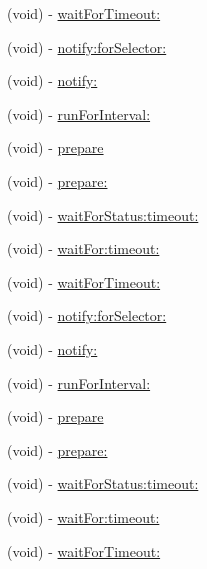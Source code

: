 \begin{DoxyCompactItemize}
\item 
(void) -\/ \hyperlink{interface_g_h_async_test_case_aaf22dd45b3493e110362392cc3dc086b}{wait\-For\-Timeout\-:}
\item 
(void) -\/ \hyperlink{interface_g_h_async_test_case_ab1be43eb4f4909ce5607b51fa0a1f40b}{notify\-:for\-Selector\-:}
\item 
(void) -\/ \hyperlink{interface_g_h_async_test_case_ad21d6cdd1f2a284ee7b5ad5b6d1c82e2}{notify\-:}
\item 
(void) -\/ \hyperlink{interface_g_h_async_test_case_accbc972d3d516d1e53529c84fa2fc510}{run\-For\-Interval\-:}
\item 
(void) -\/ \hyperlink{interface_g_h_async_test_case_a8eda5b64c599e0c48bbd206840bd4cde}{prepare}
\item 
(void) -\/ \hyperlink{interface_g_h_async_test_case_a085b47a16f4a790d77ba78bd2eafb3ff}{prepare\-:}
\item 
(void) -\/ \hyperlink{interface_g_h_async_test_case_ae8781529003ebef3a06569c0157687ae}{wait\-For\-Status\-:timeout\-:}
\item 
(void) -\/ \hyperlink{interface_g_h_async_test_case_a43422127c8303a93f0ae39c883a2da06}{wait\-For\-:timeout\-:}
\item 
(void) -\/ \hyperlink{interface_g_h_async_test_case_aaf22dd45b3493e110362392cc3dc086b}{wait\-For\-Timeout\-:}
\item 
(void) -\/ \hyperlink{interface_g_h_async_test_case_ab1be43eb4f4909ce5607b51fa0a1f40b}{notify\-:for\-Selector\-:}
\item 
(void) -\/ \hyperlink{interface_g_h_async_test_case_ad21d6cdd1f2a284ee7b5ad5b6d1c82e2}{notify\-:}
\item 
(void) -\/ \hyperlink{interface_g_h_async_test_case_accbc972d3d516d1e53529c84fa2fc510}{run\-For\-Interval\-:}
\item 
(void) -\/ \hyperlink{interface_g_h_async_test_case_a8eda5b64c599e0c48bbd206840bd4cde}{prepare}
\item 
(void) -\/ \hyperlink{interface_g_h_async_test_case_a085b47a16f4a790d77ba78bd2eafb3ff}{prepare\-:}
\item 
(void) -\/ \hyperlink{interface_g_h_async_test_case_ae8781529003ebef3a06569c0157687ae}{wait\-For\-Status\-:timeout\-:}
\item 
(void) -\/ \hyperlink{interface_g_h_async_test_case_a43422127c8303a93f0ae39c883a2da06}{wait\-For\-:timeout\-:}
\item 
(void) -\/ \hyperlink{interface_g_h_async_test_case_aaf22dd45b3493e110362392cc3dc086b}{wait\-For\-Timeout\-:}

\end{DoxyCompactItemize}
